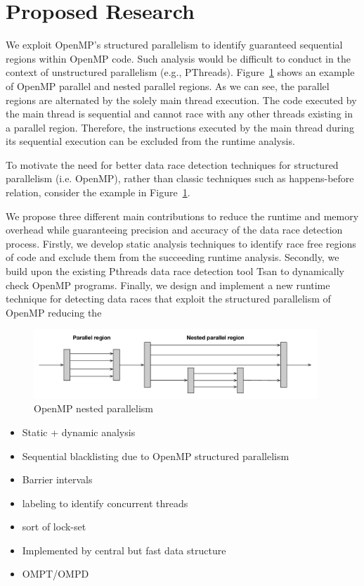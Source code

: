 \section{Proposed Research}
\label{sec:proposedresearch}

We exploit OpenMP's structured parallelism to identify guaranteed sequential
regions within OpenMP code.
%
Such analysis would be difficult to conduct in the context of unstructured
parallelism (e.g., PThreads).
%
Figure~\ref{fig:nested} shows an example of OpenMP parallel and nested
parallel regions.
%
As we can see, the parallel regions are alternated by the solely main thread
execution.
%
The code executed by the main thread is sequential and cannot race with any
other threads existing in a parallel region.
%
Therefore, the instructions executed by the main thread during its sequential
execution can be excluded from the runtime analysis.
%



To motivate the need for better data race detection techniques for structured
parallelism (i.e. OpenMP), rather than classic techniques such as
happens-before relation, consider the example in Figure~\ref{fig:nested}.
%

We propose three different main contributions to reduce the runtime and memory
overhead while guaranteeing precision and accuracy of the data race detection
process.
%
Firstly, we develop static analysis techniques to identify race free regions
of code and exclude them from the succeeding runtime analysis.
%
Secondly, we build upon the existing Pthreads data race detection tool Tsan to
dynamically check OpenMP programs.
%
Finally, we design and implement a new runtime technique for detecting data races that
exploit the structured parallelism of OpenMP reducing the 

\begin{figure}
  \centering
  \includegraphics[width=0.95\textwidth]{figures/nested_parallelism}
  \caption{OpenMP nested parallelism}
  \label{fig:nested}
\end{figure}

\begin{itemize}
\item Static + dynamic analysis
\item Sequential blacklisting due to OpenMP structured parallelism
\item Barrier intervals
\item labeling to identify concurrent threads
\item sort of lock-set
\item Implemented by central but fast data structure
\item OMPT/OMPD
\end{itemize}

